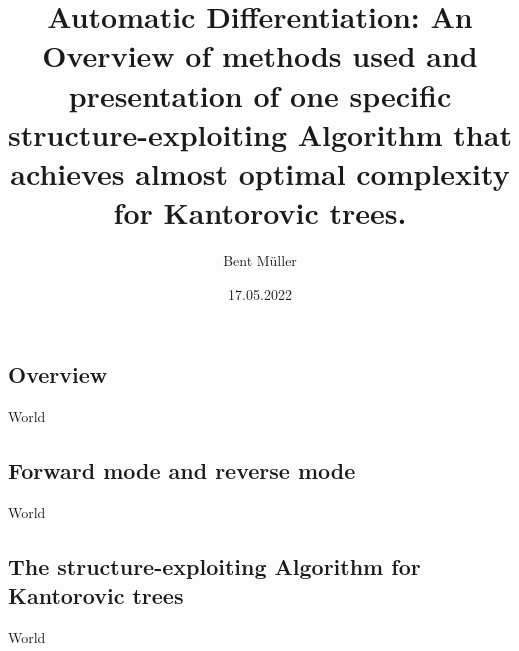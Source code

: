 \documentclass[compress]{beamer}
\title{
	Automatic Differentiation:
	An Overview of methods used and presentation of one
	specific structure-exploiting Algorithm that achieves
	almost optimal complexity for Kantorovic trees.
}
\author{Bent Müller}
\institute{Universität Hamburg}
\date{17.05.2022}
\begin{document}
\begin{frame}
	\titlepage
\end{frame}


\begin{frame}
	\section{Overview}
	World
\end{frame}

\begin{frame}
	\section{Forward mode and reverse mode}
	World
\end{frame}

\begin{frame}
	\section{The structure-exploiting Algorithm for Kantorovic trees}
	World
\end{frame}
\end{document}
